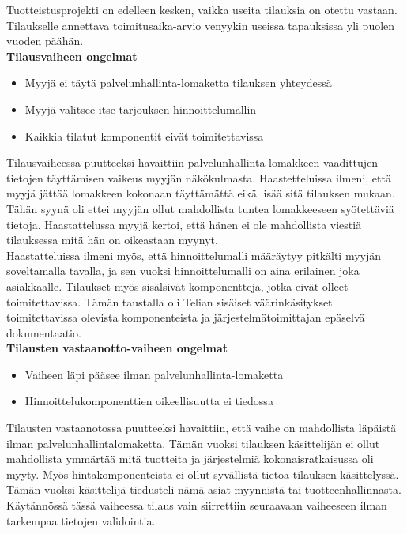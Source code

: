 \documentclass[finnish,12pt,a4paper,pdftex]{article}
\begin{document}
Tuotteistusprojekti on edelleen kesken, vaikka useita tilauksia on otettu vastaan. Tilaukselle annettava toimitusaika-arvio venyykin useissa tapauksissa yli puolen vuoden päähän.\\


\textbf{Tilausvaiheen ongelmat}\\

\begin{itemize}
    \item Myyjä ei täytä palvelunhallinta-lomaketta tilauksen yhteydessä
    \item Myyjä valitsee itse tarjouksen hinnoittelumallin
    \item Kaikkia tilatut komponentit eivät toimitettavissa
\end{itemize}

Tilausvaiheessa puutteeksi havaittiin palvelunhallinta-lomakkeen vaadittujen tietojen täyttämisen vaikeus myyjän näkökulmasta. Haastetteluissa ilmeni, että myyjä jättää lomakkeen kokonaan täyttämättä eikä lisää sitä tilauksen mukaan. Tähän syynä oli ettei myyjän ollut mahdollista tuntea lomakkeeseen syötettäviä tietoja. Haastattelussa myyjä kertoi, että hänen ei ole mahdollista viestiä tilauksessa mitä hän on oikeastaan myynyt.\\

Haastatteluissa ilmeni myös, että hinnoittelumalli määräytyy pitkälti myyjän soveltamalla tavalla, ja sen vuoksi hinnoittelumalli on aina erilainen joka asiakkaalle. Tilaukset myös sisälsivät komponentteja, jotka eivät olleet toimitettavissa. Tämän taustalla oli Telian sisäiset väärinkäsitykset toimitettavissa olevista komponenteista ja järjestelmätoimittajan epäselvä dokumentaatio.\\ 

\textbf{Tilausten vastaanotto-vaiheen ongelmat}\\
\begin{itemize}
    \item Vaiheen läpi pääsee ilman palvelunhallinta-lomaketta
    \item Hinnoittelukomponenttien oikeellisuutta ei tiedossa
\end{itemize}

Tilausten vastaanotossa puutteeksi havaittiin, että vaihe on mahdollista läpäistä ilman palvelunhallintalomaketta. Tämän vuoksi tilauksen käsittelijän ei ollut mahdollista ymmärtää mitä tuotteita ja järjestelmiä kokonaisratkaisussa oli myyty. Myös hintakomponenteista ei ollut syvällistä tietoa tilauksen käsittelyssä. Tämän vuoksi käsittelijä tiedusteli nämä asiat myynnistä tai tuotteenhallinnasta. Käytännössä tässä vaiheessa tilaus vain siirrettiin seuraavaan vaiheeseen ilman tarkempaa tietojen validointia.\\
\end{document}
